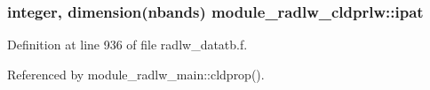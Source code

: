 \subsubsection[{\texorpdfstring{ipat}{ipat}}]{\setlength{\rightskip}{0pt plus 5cm}integer, dimension(nbands) module\+\_\+radlw\+\_\+cldprlw\+::ipat}\hypertarget{namespacemodule__radlw__cldprlw_a9e8ebd81d5d62c2be4c006a595493aed}{}\label{namespacemodule__radlw__cldprlw_a9e8ebd81d5d62c2be4c006a595493aed}


Definition at line 936 of file radlw\+\_\+datatb.\+f.



Referenced by module\+\_\+radlw\+\_\+main\+::cldprop().

